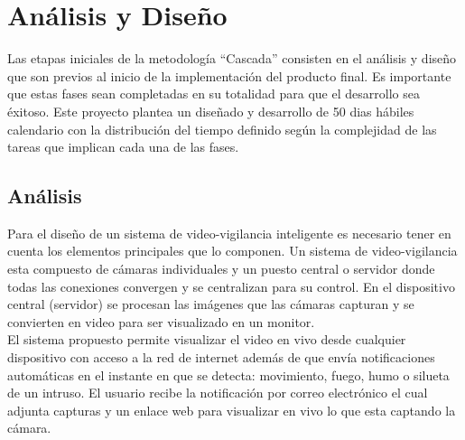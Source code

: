 \chapter{Análisis y Diseño}

Las etapas iniciales de la metodología ``Cascada'' consisten en el análisis y diseño que son previos al inicio de la implementación del producto final. Es importante que estas fases sean completadas en su totalidad para que el desarrollo sea éxitoso. Este proyecto plantea un diseñado y desarrollo de 50 dias hábiles calendario con la distribución del tiempo definido según la complejidad de las tareas que implican cada una de las fases.\\

\section{Análisis}
Para el diseño de un sistema de video-vigilancia inteligente es necesario tener en cuenta los elementos principales que lo componen. Un sistema de video-vigilancia esta compuesto de cámaras individuales y un puesto central o servidor donde todas las conexiones convergen y se centralizan para su control. En el dispositivo central (servidor) se procesan las imágenes que las cámaras capturan y se convierten en video para ser visualizado en un monitor.\\

El sistema propuesto permite visualizar el video en vivo desde cualquier dispositivo con acceso a la red de internet además de que envía notificaciones automáticas en el instante en que se detecta: movimiento, fuego, humo o silueta de un intruso. El usuario recibe la notificación por correo electrónico el cual adjunta capturas y un enlace web para visualizar en vivo lo que esta captando la cámara.\\


